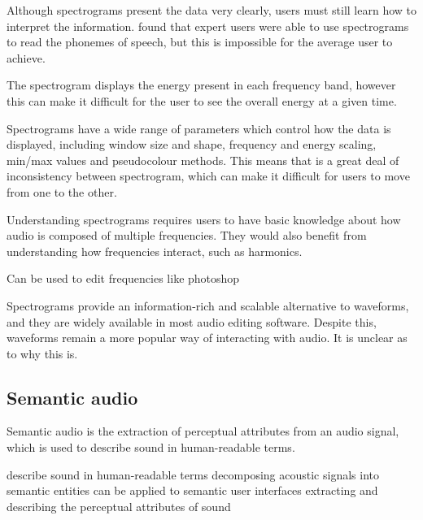 Although spectrograms present the data very clearly, users must still learn how to interpret the information.  
\citet{Zue1986} found that expert users were able to use spectrograms to read the phonemes of speech, but this is
impossible for the average user to achieve.

The spectrogram displays the energy present in each frequency band, however this can make it difficult for the user to
see the overall energy at a given time.

Spectrograms have a wide range of parameters which control how the data is displayed, including window size and 
shape, frequency and energy scaling, min/max values and pseudocolour methods. This means that is a great deal of
inconsistency between spectrogram, which can make it difficult for users to move from one to the other.

Understanding spectrograms requires users to have basic knowledge about how audio is composed of multiple frequencies.
They would also benefit from understanding how frequencies interact, such as harmonics.

Can be used to edit frequencies like photoshop \cite{Boogaart2006}



Spectrograms provide an information-rich and scalable alternative to waveforms, and they are widely available in most
audio editing software. Despite this, waveforms remain a more popular way of interacting with audio. It is unclear as
to why this is.

\subsection{Semantic audio}
Semantic audio is the extraction of perceptual attributes from an audio signal, which is used to describe sound in
human-readable terms.

describe sound in human-readable terms
decomposing acoustic signals into semantic entities
can be applied to semantic user interfaces
extracting and describing the perceptual attributes of sound

